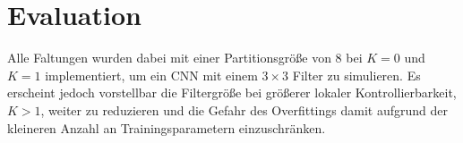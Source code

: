 \chapter{Evaluation}
\label{evaluation}






Alle Faltungen wurden dabei mit einer Partitionsgröße von $8$ bei $K=0$ und $K=1$ implementiert, um ein \gls{CNN} mit einem $3 \times 3$ Filter zu simulieren.
Es erscheint jedoch vorstellbar die Filtergröße bei größerer lokaler Kontrollierbarkeit, \dhe{} $K > 1$, weiter zu reduzieren und die Gefahr des Overfittings damit aufgrund der kleineren Anzahl an Trainingsparametern einzuschränken.




